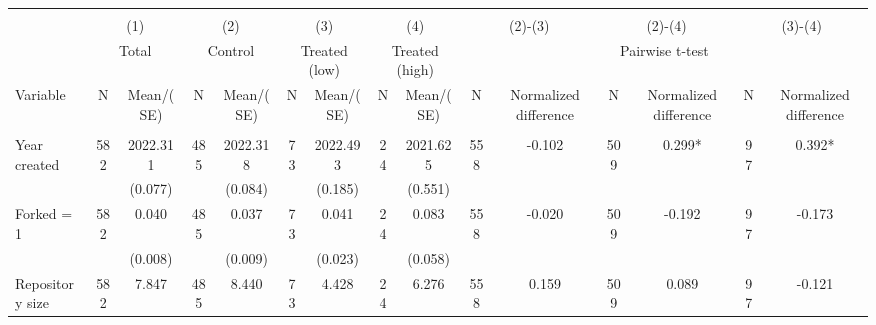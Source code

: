 
\begin{tabular}{@{\extracolsep{5pt}}lcccccccccccccc}
\\[-1.8ex]\hline \hline \\[-1.8ex]
 & \multicolumn{2}{c}{(1)}  & \multicolumn{2}{c}{(2)}  & \multicolumn{2}{c}{(3)}  & \multicolumn{2}{c}{(4)}  & \multicolumn{2}{c}{(2)-(3)} & \multicolumn{2}{c}{(2)-(4)} & \multicolumn{2}{c}{(3)-(4)} \\
 & \multicolumn{2}{c}{Total}  & \multicolumn{2}{c}{Control}  & \multicolumn{2}{c}{Treated (low)}  & \multicolumn{2}{c}{Treated (high)}  & \multicolumn{6}{c}{Pairwise t-test}  \\
Variable & N & Mean/(SE) & N & Mean/(SE) & N & Mean/(SE) & N & Mean/(SE) & N & Normalized difference & N & Normalized difference & N & Normalized difference \\ \hline \\[-1.8ex] 
Year created   & 582    & 2022.311    & 485    & 2022.318    & 73    & 2022.493    & 24    & 2021.625    & 558    & -0.102    & 509    & 0.299*    & 97    & 0.392*   \\
 &   & (0.077)  &   & (0.084)  &   & (0.185)  &   & (0.551)  &   &  &   &  &   &  \\ [1ex]
Forked = 1   & 582    & 0.040    & 485    & 0.037    & 73    & 0.041    & 24    & 0.083    & 558    & -0.020    & 509    & -0.192    & 97    & -0.173   \\
 &   & (0.008)  &   & (0.009)  &   & (0.023)  &   & (0.058)  &   &  &   &  &   &  \\ [1ex]
Repository size   & 582    & 7.847    & 485    & 8.440    & 73    & 4.428    & 24    & 6.276    & 558    & 0.159    & 509    & 0.089    & 97    & -0.121   \\

\end{tabular}
